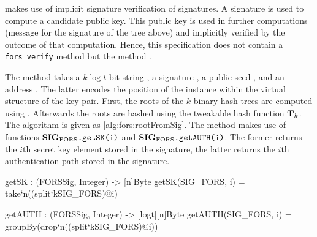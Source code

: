    \spx makes use of implicit signature verification of \fors signatures.
   A \fors signature is used to compute a candidate \fors public key. This
   public key is used in further computations (message for the signature of
   the \xmss tree above) and implicitly verified by the outcome of that computation. Hence, this specification does
   not contain a \texttt{fors\_verify} method but the method
   \forspkfromsig.

   The method \forspkfromsig takes a $k\log t$-bit string \msg,
   a \fors signature \forssig, a public seed \pseed, and
   an address \adrs. The latter encodes the position of the \fors
   instance within the virtual structure of the \spx key pair.
   First, the roots of the $k$ binary hash trees are computed using
   \forstreehash. Afterwards the roots are hashed using the tweakable hash
   function $\mathbf{T}_k$.
   The algorithm \forspkfromsig is given
   as \autoref{alg:fors:rootFromSig}. The method \forspkfromsig makes use of
   functions $\mathbf{SIG_{\textrm{FORS}}}\texttt{.getSK(i)}$ and $\mathbf{SIG_{\textrm{FORS}}}\texttt{.getAUTH(i)}$. The
   former returns the $i$th secret key element stored in the
   signature, the latter returns the $i$th authentication path stored in
   the signature.

\begin{code}
  getSK : (FORSSig, Integer) -> [n]Byte
  getSK(SIG_FORS, i) = take`{n}((split`{k}SIG_FORS)@i)

  getAUTH : (FORSSig, Integer) -> [logt][n]Byte
  getAUTH(SIG_FORS, i) = groupBy(drop`{n}((split`{k}SIG_FORS)@i))
\end{code}


